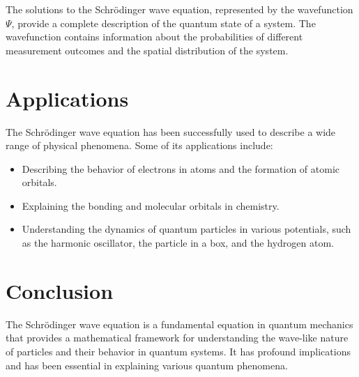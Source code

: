 \documentclass{article}
\begin{document}
The solutions to the Schrödinger wave equation, represented by the wavefunction $\Psi$, provide a complete description of the quantum state of a system. The wavefunction contains information about the probabilities of different measurement outcomes and the spatial distribution of the system.

\section{Applications}

The Schrödinger wave equation has been successfully used to describe a wide range of physical phenomena. Some of its applications include:

\begin{itemize}
  \item Describing the behavior of electrons in atoms and the formation of atomic orbitals.
  \item Explaining the bonding and molecular orbitals in chemistry.
  \item Understanding the dynamics of quantum particles in various potentials, such as the harmonic oscillator, the particle in a box, and the hydrogen atom.
\end{itemize}

\section{Conclusion}

The Schrödinger wave equation is a fundamental equation in quantum mechanics that provides a mathematical framework for understanding the wave-like nature of particles and their behavior in quantum systems. It has profound implications and has been essential in explaining various quantum phenomena.

\cite{beiser1963}



\end{document}
